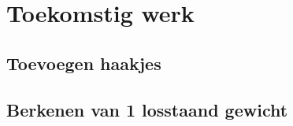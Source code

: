 \documentclass[Main.tex]{subfiles}
\begin{document}
\section{Toekomstig werk}
\subsection{Toevoegen haakjes}
\subsection{Berkenen van 1 losstaand gewicht}
\end{document}
